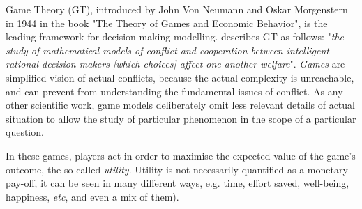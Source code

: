 \documentclass[12pt,a4paper]{article}
\begin{document}
Game Theory (GT), introduced by John Von Neumann and Oskar Morgenstern in 1944 in the book "The Theory of Games and Economic Behavior", is the leading framework for decision-making modelling.
\cite{myerson1997game} describes GT as follows: "\textit{the study of mathematical models of conflict and cooperation between intelligent rational decision makers [which choices] affect one another welfare}". %
\textit{Games} are simplified vision of actual conflicts, because the actual complexity is unreachable, and can prevent from understanding the fundamental issues of conflict. %
As any other scientific work, game models deliberately omit less relevant details of actual situation to allow the study of particular phenomenon in the scope of a particular question.

In these games, players act in order to maximise the expected value of the game's outcome, the so-called \textit{utility}.
Utility is not necessarily quantified as a monetary pay-off, it can be seen in many different ways, e.g. time, effort saved, well-being, happiness, \textit{etc}, and even a mix of them).
\end{document}
